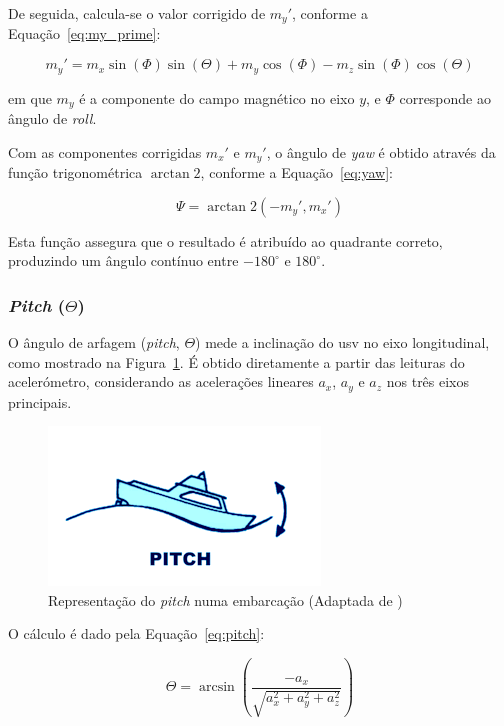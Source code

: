 De seguida, calcula-se o valor corrigido de \(m_y'\), conforme a Equação~\ref{eq:my_prime}:

\begin{equation}
    m_y' = m_x \sin(\Phi) \sin(\Theta) + m_y \cos(\Phi) - m_z \sin(\Phi) \cos(\Theta)
    \label{eq:my_prime}
\end{equation}

em que \(m_y\) é a componente do campo magnético no eixo \(y\), e \(\Phi\) corresponde ao ângulo de \emph{roll}.  

Com as componentes corrigidas \(m_x'\) e \(m_y'\), o ângulo de \emph{yaw} é obtido através da função trigonométrica \(\arctan2\), conforme a Equação~\ref{eq:yaw}:

\begin{equation}
    \Psi = \arctan2(-m_y', m_x')
    \label{eq:yaw}
\end{equation}

Esta função assegura que o resultado é atribuído ao quadrante correto, produzindo um ângulo contínuo entre \(-180^\circ\) e \(180^\circ\).

\subsubsection{\emph{Pitch} (\(\Theta\))}

O ângulo de arfagem (\emph{pitch}, \(\Theta\)) mede a inclinação do \gls{usv} no eixo longitudinal, como mostrado na Figura~\ref{fig:pitch}. É obtido diretamente a partir das leituras do acelerómetro, considerando as acelerações lineares \(a_x\), \(a_y\) e \(a_z\) nos três eixos principais.

\begin{figure}[H]
    \centering
    \includegraphics[height=0.2\linewidth]{figuras/Pitch.png}
    \caption[Representação do \emph{pitch} numa embarcação]{Representação do \emph{pitch} numa embarcação (Adaptada de \cite{imagem-yaw-pitch-roll})}
    \label{fig:pitch}
\end{figure}

O cálculo é dado pela Equação~\ref{eq:pitch}:

\begin{equation}
    \Theta = \arcsin{\left(\frac{-a_x}{\sqrt{a_x^2 + a_y^2 + a_z^2}}\right)}
    \label{eq:pitch}
\end{equation}

